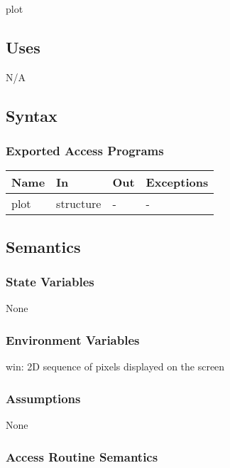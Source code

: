 \documentclass[12pt, titlepage]{article}
\begin{document}
plot

\subsection{Uses}

N/A

\subsection{Syntax}

\subsubsection{Exported Access Programs}

\begin{center}
\begin{tabular}{p{2cm} p{3cm} p{2cm} p{2cm}}
\hline
\textbf{Name} & \textbf{In} & \textbf{Out} & \textbf{Exceptions} \\
\hline
plot & structure & - & - \\
\hline
\end{tabular}
\end{center}

\subsection{Semantics}

\subsubsection{State Variables}

None

\subsubsection{Environment Variables}

win: 2D sequence of pixels displayed on the screen\\

\subsubsection{Assumptions}

None

\subsubsection{Access Routine Semantics}
\end{document}
